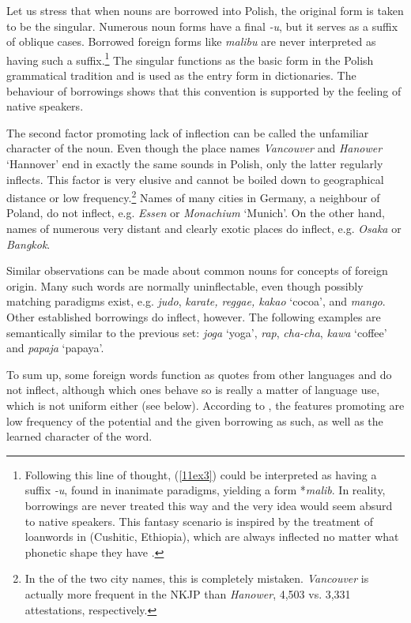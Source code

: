 \documentclass[output=paper,colorlinks,citecolor=brown]{langscibook}
\begin{document}
Let us stress that when nouns are borrowed into Polish, the original form is taken to be the  singular. Numerous noun forms have a final \emph{-u}, but it serves as a suffix of oblique cases. Borrowed foreign forms like \emph{malibu} are never interpreted as having such a suffix.\footnote{Following this line of thought, (\ref{11ex3}) could be interpreted as having a  suffix \emph{-u}, found in  inanimate paradigms, yielding a  form *\emph{malib}. In reality, borrowings are never treated this way and the very idea would seem absurd to native speakers. This fantasy scenario is inspired by the treatment of loanwords in  (Cushitic, Ethiopia), which are always inflected no matter what phonetic shape they have \citep{treis2023}.} The  singular functions as the basic form in the Polish grammatical tradition and is used as the entry form in dictionaries. The behaviour of borrowings shows that this convention is supported by the feeling of native speakers.

The second factor promoting lack of inflection can be called the unfamiliar character of the noun. Even though the place names \emph{Vancouver} and \emph{Hanower} `Hannover' end in exactly the same sounds in Polish, only the latter regularly inflects. This factor is very elusive and cannot be boiled down to geographical distance or low frequency.\footnote{In the  of the two city names, this is completely mistaken. \emph{Vancouver} is actually more frequent in the NKJP than \emph{Hanower}, 4,503 vs. 3,331 attestations, respectively.} Names of many cities in Germany, a neighbour of Poland, do not inflect, e.g. \emph{Essen} or \emph{Monachium} `Munich'. On the other hand, names of numerous very distant and clearly exotic places do inflect, e.g. \emph{Osaka} or \emph{Bangkok}.

Similar observations can be made about common nouns for concepts of foreign origin. Many such words are normally uninflectable, even though possibly matching paradigms exist, e.g. \emph{judo}, \emph{karate, reggae, kakao} `cocoa', and \emph{mango}. Other established borrowings do inflect, however. The following examples are semantically similar to the previous set: \emph{joga} `yoga', \emph{rap}, \emph{cha-cha}, \emph{kawa} `coffee' and \emph{papaja} `papaya'.

To sum up, some foreign words function as quotes from other languages \citep[36, 40]{krzyzanowski2013} and do not inflect, although which ones behave so is really a matter of language use, which is not uniform either (see below). According to \citet[84--85]{dunaj2004}, the features promoting  are low frequency of the potential  and the given borrowing as such, as well as the learned character of the
word.
\end{document}
